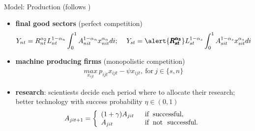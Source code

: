 \documentclass[11pt,aspectratio=169]{beamer}
\begin{document}
\begin{frame}{Model: Production
\footnotesize{(follows \cite{Acemoglu2012TheChange})}}
\begin{itemize}
	\item<+-> \textbf{final good sectors} (perfect competition)
	 \begin{align*}
	 &Y_{nt}=R_{nt}^{\alpha_{2}} L_{nt}^{1-\alpha_n}\int_{0}^{1}A_{nit}^{1-\alpha_n}x_{nit}^{\alpha_n} di; \ 
	 &Y_{st}=\alert{\pmb{R_{st}^{\alpha_{3}}}} L_{st}^{1-\alpha_s}\int_{0}^{1}A_{sit}^{1-\alpha_s}x_{sit}^{\alpha_s} di
	 \end{align*}
	\item<+-> \textbf{machine producing firms} (monopolistic competition)
	\begin{align*}
	\underset{x_{ijt}}{max}\  p_{ijt}x_{ijt}-\psi x_{ijt}, \ \text{for}\  j\in\{s,n\}
	\end{align*}

	\item<+-> \textbf{research}: scientiests decide each period where to allocate their research; better technology with success probability $\eta\in(0,1)$
\begin{align*}
A_{jit+1}=\left\{
\begin{array}{ll}
(1+\gamma)A_{jit}& \hspace{2mm} \text{if} \hspace*{2mm}\text{successful},\\
A_{jit}  &\hspace{2mm}\text{if}\hspace{2mm} \text{not \ successful}.
\end{array}
\right.
\end{align*}
\end{itemize}
\end{frame}
\end{document}
